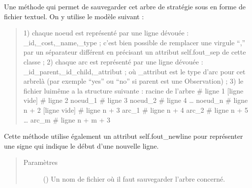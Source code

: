 \documentclass[letterpaper,10pt,french]{sphinxmanual}
\begin{document}
\begin{fulllineitems}
\begin{fulllineitems}
\label{\detokenize{index:StrategyTree.StrategyTree.to_file}}
Une méthode qui permet de sauvegarder cet arbre de stratégie sous en forme de fichier textuel. On y utilise le
modèle suivant :
\begin{quote}

1) chaque noeud est représenté par une ligne dévouée : \_id,\_cost,\_name,\_type ; c’est bien possible de
remplacer une virgule “,” par un séparateur différent en précisant un attribut self.fout\_sep de
cette classe ;
2) chaque arc est représenté par une ligne dévouée : \_id\_parent,\_id\_child,\_attribut ; où \_attribut est le
type d’arc pour cet arbre\sphinxhyphen{}là (par exemple “yes” ou “no” si parent est une Observation) ;
3) le fichier lui\sphinxhyphen{}même a la structure suivante :
racine de l’arbre    \# ligne 1
{[}ligne vide{]}         \# ligne 2
noeud\_1              \# ligne 3
noeud\_2              \# ligne 4
…
noeud\_n              \# ligne n + 2
{[}ligne vide{]}         \# ligne n + 3
arc\_1                \# ligne n + 4
arc\_2                \# ligne n + 5
…
arc\_m                \# ligne n + m + 3
\end{quote}

Cette méthode utilise également un attribut self.fout\_newline pour représenter une signe qui indique le début
d’une nouvelle ligne.
\begin{quote}\begin{description}
\item[{Paramètres}] \leavevmode
{} (\sphinxstyleliteralemphasis{\sphinxupquote{, }}) \textendash{} Un nom de fichier où il faut sauvegarder l’arbre concerné.

\end{description}\end{quote}

\end{fulllineitems}



\end{fulllineitems}
\end{document}
